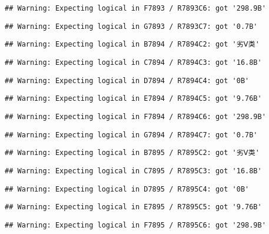 \documentclass[
]{article}
\begin{document}
\begin{verbatim}
## Warning: Expecting logical in F7893 / R7893C6: got '298.9B'
\end{verbatim}

\begin{verbatim}
## Warning: Expecting logical in G7893 / R7893C7: got '0.7B'
\end{verbatim}

\begin{verbatim}
## Warning: Expecting logical in B7894 / R7894C2: got '劣Ⅴ类'
\end{verbatim}

\begin{verbatim}
## Warning: Expecting logical in C7894 / R7894C3: got '16.8B'
\end{verbatim}

\begin{verbatim}
## Warning: Expecting logical in D7894 / R7894C4: got '0B'
\end{verbatim}

\begin{verbatim}
## Warning: Expecting logical in E7894 / R7894C5: got '9.76B'
\end{verbatim}

\begin{verbatim}
## Warning: Expecting logical in F7894 / R7894C6: got '298.9B'
\end{verbatim}

\begin{verbatim}
## Warning: Expecting logical in G7894 / R7894C7: got '0.7B'
\end{verbatim}

\begin{verbatim}
## Warning: Expecting logical in B7895 / R7895C2: got '劣Ⅴ类'
\end{verbatim}

\begin{verbatim}
## Warning: Expecting logical in C7895 / R7895C3: got '16.8B'
\end{verbatim}

\begin{verbatim}
## Warning: Expecting logical in D7895 / R7895C4: got '0B'
\end{verbatim}

\begin{verbatim}
## Warning: Expecting logical in E7895 / R7895C5: got '9.76B'
\end{verbatim}

\begin{verbatim}
## Warning: Expecting logical in F7895 / R7895C6: got '298.9B'
\end{verbatim}
\end{document}
